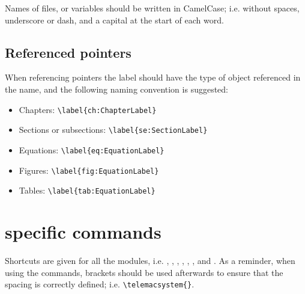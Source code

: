 Names of files, or variables should be written in CamelCase; i.e. without
spaces, underscore or dash, and a capital at the start of each word.

\subsection{Referenced pointers}

When referencing pointers the label should have the type of object referenced
in the name, and the following naming convention is suggested:

\begin{itemize}
\item Chapters: \verb+\label{ch:ChapterLabel}+
\item Sections or subsections: \verb+\label{se:SectionLabel}+
\item Equations: \verb+\label{eq:EquationLabel}+
\item Figures: \verb+\label{fig:EquationLabel}+
\item Tables: \verb+\label{tab:EquationLabel}+
\end{itemize}


\section{\texorpdfstring{\telemacsystem{}}{Telemac} specific commands}

Shortcuts are given for all the modules, i.e. \telemacsystem{}, \artemis{},
\bief{}, , , \tomawac{}, \khione{} and \gaia{}. As a
reminder, when using the commands, brackets should be used afterwards to ensure
that the spacing is correctly defined; i.e. \verb+\telemacsystem{}+.


